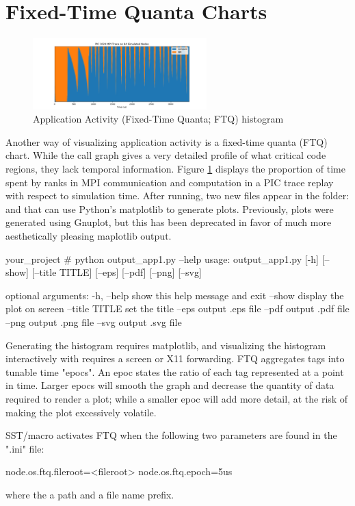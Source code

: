 

\section{Fixed-Time Quanta Charts}

\label{sec:tutorials:ftq}

\begin{figure}[h!]
\centering
\includegraphics[width=0.6\textwidth]{figures/matplotlib/ftq/pic1024.png}
\caption{Application Activity (Fixed-Time Quanta; FTQ) histogram}
\label{fig:ftq}
\end{figure}

Another way of visualizing application activity is a fixed-time quanta (FTQ) chart.
While the call graph gives a very detailed profile of what critical code regions, they lack temporal information. 
Figure \ref{fig:ftq} displays the proportion of time spent by ranks in MPI communication and computation in a PIC trace replay with respect to simulation time.
After running, two new files appear in the folder:  and  that can use Python's matplotlib to generate plots.
Previously, plots were generated using Gnuplot, but this has been deprecated in favor of much more aesthetically pleasing maplotlib output.

\begin{ShellCmd}
your_project # python output_app1.py --help
usage: output_app1.py [-h] [--show] [--title TITLE] [--eps] [--pdf] [--png]
                      [--svg]

optional arguments:
  -h, --help     show this help message and exit
  --show         display the plot on screen
  --title TITLE  set the title
  --eps          output .eps file
  --pdf          output .pdf file
  --png          output .png file
  --svg          output .svg file
\end{ShellCmd}

Generating the histogram requires matplotlib, and visualizing the histogram interactively with  requires a screen or X11 forwarding.
FTQ aggregates tags into tunable time "epocs".
An epoc states the ratio of each tag represented at a point in time.
Larger epocs will smooth the graph and decrease the quantity of data required to render a plot; while a smaller epoc will add more detail, at the risk of making the plot excessively volatile.


SST/macro activates FTQ when the following two parameters are found in the ".ini" file:

\begin{ViFile}
node.os.ftq.fileroot=<fileroot>
node.os.ftq.epoch=5us
\end{ViFile}
where the  a path and a file name prefix.
